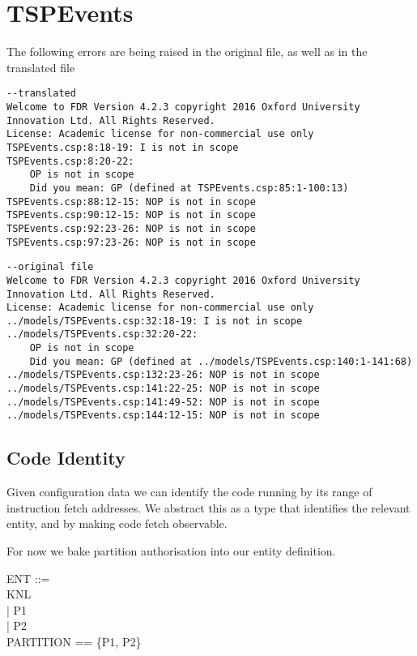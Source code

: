 %
%
%
\section{TSPEvents}


The following errors are being raised in the original file, as well as in the translated file
\begin{verbatim}
--translated
Welcome to FDR Version 4.2.3 copyright 2016 Oxford University Innovation Ltd. All Rights Reserved.
License: Academic license for non-commercial use only
TSPEvents.csp:8:18-19: I is not in scope
TSPEvents.csp:8:20-22:
    OP is not in scope
    Did you mean: GP (defined at TSPEvents.csp:85:1-100:13)
TSPEvents.csp:88:12-15: NOP is not in scope
TSPEvents.csp:90:12-15: NOP is not in scope
TSPEvents.csp:92:23-26: NOP is not in scope
TSPEvents.csp:97:23-26: NOP is not in scope

\end{verbatim}

\begin{verbatim}
--original file
Welcome to FDR Version 4.2.3 copyright 2016 Oxford University Innovation Ltd. All Rights Reserved.
License: Academic license for non-commercial use only
../models/TSPEvents.csp:32:18-19: I is not in scope
../models/TSPEvents.csp:32:20-22:
    OP is not in scope
    Did you mean: GP (defined at ../models/TSPEvents.csp:140:1-141:68)
../models/TSPEvents.csp:132:23-26: NOP is not in scope
../models/TSPEvents.csp:141:22-25: NOP is not in scope
../models/TSPEvents.csp:141:49-52: NOP is not in scope
../models/TSPEvents.csp:144:12-15: NOP is not in scope

\end{verbatim}

\subsection{Code Identity}%

Given configuration data we can identify the code running
by its range of instruction fetch addresses.
We abstract this as a type that identifies the relevant entity,
and by making code fetch observable.

For now we bake partition authorisation into our entity definition.

\begin{circus}
ENT ::=\\
  KNL\\  %
 | P1\\   %
 | P2\\   %
PARTITION == \{P1, P2\}
\end{circus}

